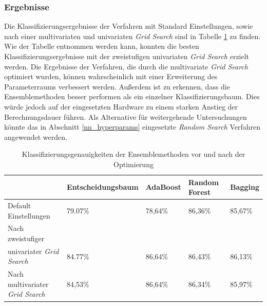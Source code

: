 \subsubsection{Ergebnisse}
Die Klassifizierungsergebnisse der Verfahren mit Standard Einstellungen, sowie nach einer multivariaten und univariaten \emph{Grid Search} sind in Tabelle \ref{table:results_grid} zu finden. Wie der Tabelle entnommen werden kann, konnten die besten Klassifizierungsergebnisse mit der zweistufigen univariaten \emph{Grid Search} erzielt werden. Die Ergebnisse der Verfahren, die durch die multivariate \emph{Grid Search} optimiert wurden, können wahrscheinlich mit einer Erweiterung des Parameterraums verbessert werden. Außerdem ist zu erkennen, dass die Ensemblemethoden besser performen als ein einzelner Klassifizierungsbaum. Dies würde jedoch auf der eingesetzten Hardware zu einem starken Anstieg der Berechnungsdauer führen. Als Alternative für weitergehende Untersuchungen könnte das in Abschnitt \ref{nn_hyperparams} eingesetzte \emph{Random Search} Verfahren angewendet werden.

\begin{table}[h]
	\begin{tabular}{lllll}
		\hline
		& Entscheidungsbaum & AdaBoost & Random Forest & Bagging \\ \hline
		Default Einstellungen         &    79.07\%               &  78,64\%        &  86,36\%             &  85,67\%       \\
		Nach zweistufiger\\
		univariater \emph{Grid Search}   &  84.77\%              &  86,64\%        &        86,43\%       &    86,13\%     \\
		Nach multivariater \emph{Grid Search} &  84,53\%                 &  86,64\%      &   86,34\%              &    85,97\%     \\ \hline
	\end{tabular}
	\caption{\label{table:results_grid} Klassifizierungsgenauigkeiten der Ensemblemethoden vor und nach der Optimierung}
\end{table}



